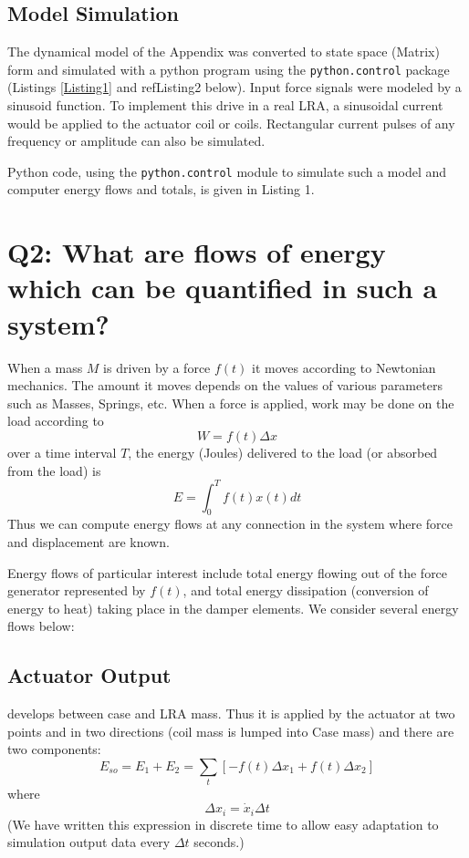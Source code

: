 \documentclass[letterpaper,11pt]{article}
\begin{document}
\subsection{Model Simulation}

The dynamical model of the Appendix was converted to state space (Matrix) form and simulated with a python program using the {\tt python.control} package
(Listings \ref{Listing1} and ref{Listing2} below).
Input force signals were modeled by a sinusoid function.
To implement this drive in a real LRA, a sinusoidal current would be applied to the
actuator coil or coils.  Rectangular current pulses of any frequency or amplitude can also be simulated.

Python code, using the {\tt python.control} module to simulate such a model and computer energy flows and
totals, is given in Listing 1.



\section{Q2: What are flows of energy which can be quantified in such a system?}
\label{WhatAreEnergyFlows}

When a mass $M$ is driven by a force $f(t)$ it moves according to Newtonian mechanics.  The amount it moves depends on the values of various
parameters such as Masses, Springs, etc.    When a force is applied, work may be done on the load according to
\[
W = f(t)\Delta x
\]
over a time interval $T$, the energy (Joules)
delivered to the load (or absorbed from the load) is
\[
E = \int_0^T f(t)x(t)dt
\]
Thus we can compute energy flows at any connection in the system where force and displacement are known.

Energy flows of particular interest include total energy flowing out of the force generator represented by $f(t)$, and
total energy dissipation (conversion of energy to heat) taking place in the damper elements.
We consider several energy flows below:

\subsection{Actuator Output}   develops between case and LRA mass. Thus
    it is applied by the actuator at two points and in two directions
    (coil mass is lumped into Case mass) and there are two components:
    \[
    E_{so} = E_1 + E_2 = \sum_t \left[ -f(t) \Delta x_1 + f(t)\Delta x_2 \right]
    \]
    where
    \[
    \Delta x_i = \dot{x}_i\Delta t
    \]
    (We have written this expression in discrete time to allow easy adaptation to
    simulation output data every $\Delta t$ seconds.)
\end{document}
